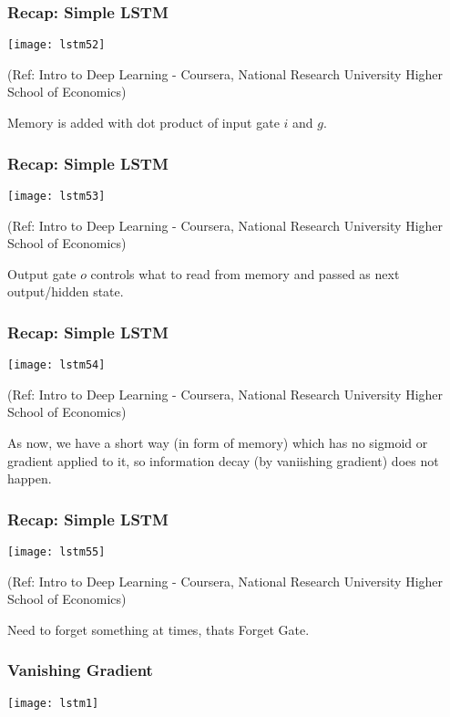 \begin{frame}[fragile] \frametitle{Recap: Simple LSTM}
\begin{center}
\texttt{[image: lstm52]}

\tiny{(Ref: Intro to Deep Learning - Coursera, National Research University Higher School of Economics)}
\end{center}
Memory is added with dot product of input gate $i$ and $g$.
\end{frame}

\begin{frame}[fragile] \frametitle{Recap: Simple LSTM}
\begin{center}
\texttt{[image: lstm53]}

\tiny{(Ref: Intro to Deep Learning - Coursera, National Research University Higher School of Economics)}
\end{center}
Output gate $o$ controls what to read from memory and passed as next output/hidden state.
\end{frame}

\begin{frame}[fragile] \frametitle{Recap: Simple LSTM}
\begin{center}
\texttt{[image: lstm54]}

\tiny{(Ref: Intro to Deep Learning - Coursera, National Research University Higher School of Economics)}
\end{center}
As now, we have a short way (in form of memory) which has no sigmoid or gradient applied to it, so information decay (by vaniishing gradient) does not happen.
\end{frame}

\begin{frame}[fragile] \frametitle{Recap: Simple LSTM}
\begin{center}
\texttt{[image: lstm55]}

\tiny{(Ref: Intro to Deep Learning - Coursera, National Research University Higher School of Economics)}
\end{center}
Need to forget something at times, thats Forget Gate.
\end{frame}
\begin{frame}[fragile] \frametitle{Vanishing Gradient}
\begin{center}
\texttt{[image: lstm1]}
\end{center}
\end{frame}

